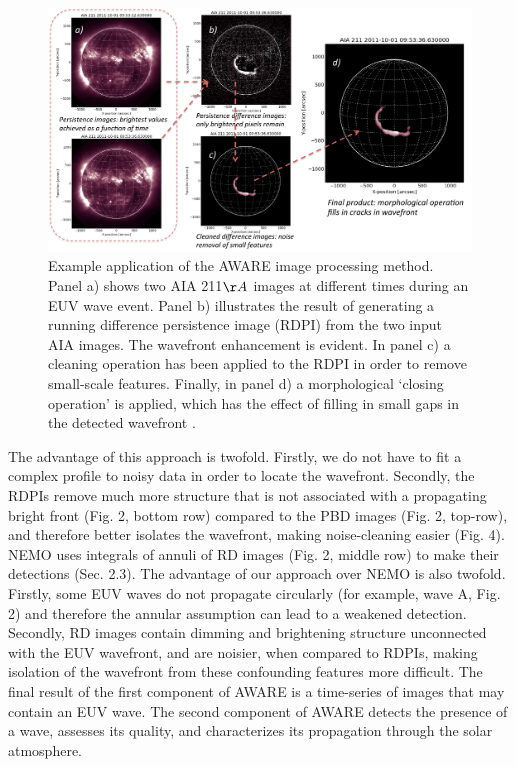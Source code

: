 \begin{figure}
\begin{center}
\includegraphics[width=16cm]{aware_figure4.pdf}
\caption{Example application of the AWARE image processing method. Panel a) shows two AIA 211$\AA$ images at different times during an EUV wave event. Panel b) illustrates the result of generating a running difference persistence image (RDPI) from the two input AIA images. The wavefront enhancement is evident. In panel c) a cleaning operation has been applied to the RDPI in order to remove small-scale features. Finally, in panel d) a morphological `closing operation' is applied, which has the effect of filling in small gaps in the detected wavefront \citep[e.g.][]{2002dip..book.....G}.}
\label{method_figure}
\end{center}
\end{figure}


The advantage of this approach is twofold. Firstly, we do not have to fit a complex profile to noisy data in order to locate the wavefront. Secondly, the RDPIs remove much more structure that is not associated with a propagating bright front (Fig. 2, bottom row) compared to the PBD images (Fig. 2, top-row), and therefore better isolates the wavefront, making noise-cleaning easier (Fig. 4).  NEMO \citep{2005SoPh..228..265P} uses integrals of annuli of RD images (Fig. 2, middle row) to make their detections (Sec. 2.3).  The advantage of our approach over NEMO is also twofold.  Firstly, some EUV waves do not propagate circularly (for example, wave A, Fig. 2) and therefore the annular assumption can lead to a weakened detection.  Secondly, RD images contain dimming and brightening structure unconnected with the EUV wavefront, and are noisier,  when compared to RDPIs, making isolation of the wavefront from these confounding features more difficult. The final result of the first component of AWARE is a time-series of images that may contain an EUV wave.  The second component of AWARE detects the presence of a wave, assesses its quality, and characterizes its propagation through the solar atmosphere.
